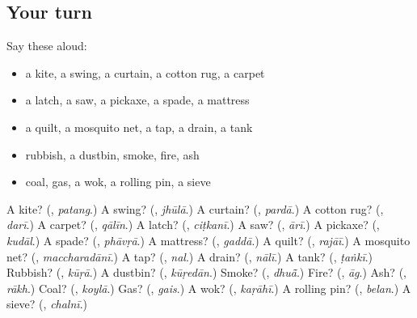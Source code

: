 \subsection*{Your turn}
Say these aloud:

\begin{itemize}
\raggedright
  \item a kite, a swing, a curtain, a cotton rug, a carpet
  \item a latch, a saw, a pickaxe, a spade, a mattress
  \item a quilt, a mosquito net, a tap, a drain, a tank
  \item rubbish, a dustbin, smoke, fire, ash
  \item coal, gas, a wok, a rolling pin, a sieve
\end{itemize}

\begin{tcolorbox}[breakable,colback=teal!4,colframe=teal!35!black,title={Before you move on}]
A kite? (\textbf{}, \emph{patang}.) A swing? (\textbf{}, \emph{jhūlā}.) A curtain? (\textbf{}, \emph{pardā}.) A cotton rug? (\textbf{}, \emph{darī}.) A carpet? (\textbf{}, \emph{qālīn}.) A latch? (\textbf{}, \emph{ciṭkanī}.) A saw? (\textbf{}, \emph{ārī}.) A pickaxe? (\textbf{}, \emph{kudāl}.) A spade? (\textbf{}, \emph{phāvṛā}.) A mattress? (\textbf{}, \emph{gaddā}.) A quilt? (\textbf{}, \emph{rajāī}.) A mosquito net? (\textbf{}, \emph{maccharadānī}.) A tap? (\textbf{}, \emph{nal}.) A drain? (\textbf{}, \emph{nālī}.) A tank? (\textbf{}, \emph{ṭaṅkī}.) Rubbish? (\textbf{}, \emph{kūṛā}.) A dustbin? (\textbf{}, \emph{kūṛedān}.) Smoke? (\textbf{}, \emph{dhuā̃}.) Fire? (\textbf{}, \emph{āg}.) Ash? (\textbf{}, \emph{rākh}.) Coal? (\textbf{}, \emph{koylā}.) Gas? (\textbf{}, \emph{gais}.) A wok? (\textbf{}, \emph{kaṛāhī}.) A rolling pin? (\textbf{}, \emph{belan}.) A sieve? (\textbf{}, \emph{chalnī}.)
\end{tcolorbox}
